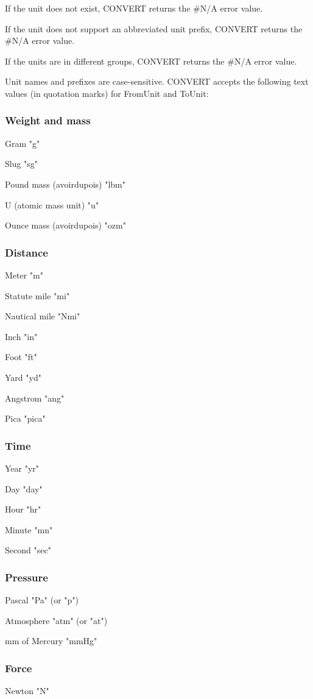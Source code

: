 If the unit does not exist, \textsf{CONVERT} returns the \#N/A error value.

If the unit does not support an abbreviated unit prefix, \textsf{CONVERT} returns the \#N/A error value.

If the units are in different groups, \textsf{CONVERT} returns the \#N/A error value.

Unit names and prefixes are case-sensitive.
\textsf{CONVERT} accepts the following text values (in quotation marks) for \textsf{FromUnit} and \textsf{ToUnit}:



\subsubsection{Weight and mass}
Gram "g" 

Slug "sg" 

Pound mass (avoirdupois) "lbm" 

U (atomic mass unit) "u" 

Ounce mass (avoirdupois) "ozm" 

\subsubsection{Distance}
Meter "m" 

Statute mile "mi" 

Nautical mile "Nmi" 

Inch "in" 

Foot "ft" 

Yard "yd" 

Angstrom "ang" 

Pica "pica" 

\subsubsection{Time}
Year "yr" 

Day "day" 

Hour "hr" 

Minute "mn" 

Second "sec" 


\subsubsection{Pressure}
Pascal "Pa" (or "p") 

Atmosphere "atm" (or "at") 

mm of Mercury "mmHg" 


\subsubsection{Force}
Newton "N" 

